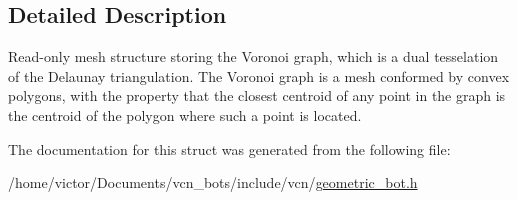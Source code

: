 \subsection{Detailed Description}
Read-\/only mesh structure storing the Voronoi graph, which is a dual tesselation of the Delaunay triangulation. The Voronoi graph is a mesh conformed by convex polygons, with the property that the closest centroid of any point in the graph is the centroid of the polygon where such a point is located. 

The documentation for this struct was generated from the following file\+:\begin{DoxyCompactItemize}
\item 
/home/victor/\+Documents/vcn\+\_\+bots/include/vcn/\hyperlink{geometric__bot_8h}{geometric\+\_\+bot.\+h}\end{DoxyCompactItemize}
